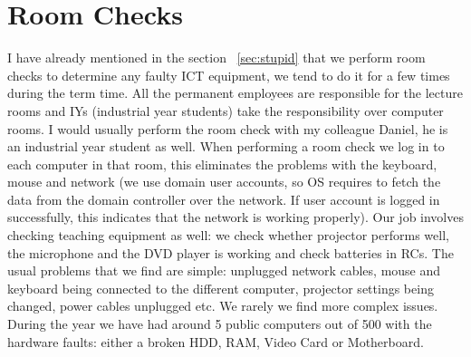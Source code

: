 \documentclass[10pt,a4paper,headinclude=true]{report}
\begin{document}
\section{Room Checks}
I have already mentioned in the section ~\ref{sec:stupid} that we perform room checks to determine any faulty ICT equipment, we tend to do it for a few times during the term time. All the permanent employees are responsible for the lecture rooms and IYs (industrial year students) take the responsibility over computer rooms. I would usually perform the room check with my colleague Daniel, he is an industrial year student as well. When performing a room check we log in to each computer in that room, this eliminates the problems with the keyboard, mouse and network (we use domain user accounts, so OS requires to fetch the data from the domain controller over the network. If user account is logged in successfully, this indicates that the network is working properly). Our job involves checking teaching equipment as well: we check whether projector performs well, the microphone and the DVD player is working and check batteries in RCs. The usual problems that we find are simple: unplugged network cables, mouse and keyboard being connected to the different computer, projector settings being changed, power cables unplugged etc. We rarely we find more complex issues. During the year we have had around 5 public computers out of 500 with the hardware faults: either a broken HDD, RAM, Video Card or Motherboard. 
\end{document}

